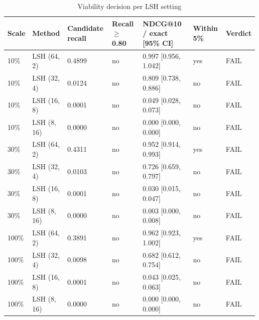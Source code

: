 \begin{table}[ht]\centering
\caption{Viability decision per LSH setting}
\begin{tabular}{lllllll}
\hline
Scale & Method & Candidate recall & Recall $\geq$ 0.80 & NDCG@10 / exact [95\% CI] & Within 5\% & Verdict \\
\hline
10\% & LSH (64, 2) & 0.4899 & no & 0.997 [0.956, 1.042] & yes & FAIL \\
10\% & LSH (32, 4) & 0.0124 & no & 0.809 [0.738, 0.886] & no & FAIL \\
10\% & LSH (16, 8) & 0.0001 & no & 0.049 [0.028, 0.073] & no & FAIL \\
10\% & LSH (8, 16) & 0.0000 & no & 0.000 [0.000, 0.000] & no & FAIL \\
30\% & LSH (64, 2) & 0.4311 & no & 0.952 [0.914, 0.993] & yes & FAIL \\
30\% & LSH (32, 4) & 0.0103 & no & 0.726 [0.659, 0.797] & no & FAIL \\
30\% & LSH (16, 8) & 0.0001 & no & 0.030 [0.015, 0.047] & no & FAIL \\
30\% & LSH (8, 16) & 0.0000 & no & 0.003 [0.000, 0.008] & no & FAIL \\
100\% & LSH (64, 2) & 0.3891 & no & 0.962 [0.923, 1.002] & yes & FAIL \\
100\% & LSH (32, 4) & 0.0098 & no & 0.682 [0.612, 0.754] & no & FAIL \\
100\% & LSH (16, 8) & 0.0001 & no & 0.043 [0.025, 0.063] & no & FAIL \\
100\% & LSH (8, 16) & 0.0000 & no & 0.000 [0.000, 0.000] & no & FAIL \\
\hline
\end{tabular}
\end{table}
